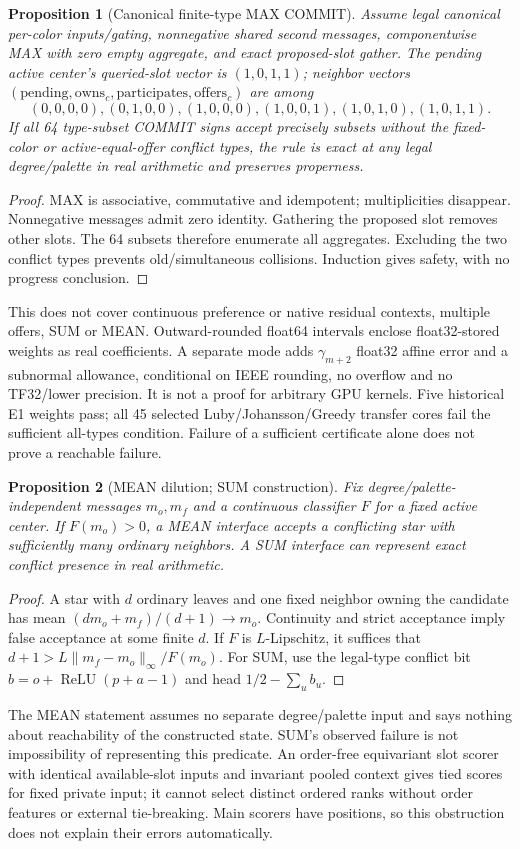 \documentclass[10pt]{article}
\newtheorem{proposition}{Proposition}
\begin{document}
\begin{proposition}[Canonical finite-type MAX COMMIT]\label{prop:max}
Assume legal canonical per-color inputs/gating, nonnegative shared second
messages, componentwise MAX with zero empty aggregate, and exact proposed-slot
gather. The pending active center's queried-slot vector is $(1,0,1,1)$;
neighbor vectors $(\text{pending},\text{owns}_c,\text{participates},\text{offers}_c)$
are among
\[
(0,0,0,0),(0,1,0,0),(1,0,0,0),(1,0,0,1),(1,0,1,0),(1,0,1,1).
\]
If all 64 type-subset COMMIT signs accept precisely subsets without the
fixed-color or active-equal-offer conflict types, the rule is exact at any
legal degree/palette in real arithmetic and preserves properness.
\end{proposition}
\begin{proof}
MAX is associative, commutative and idempotent; multiplicities disappear.
Nonnegative messages admit zero identity. Gathering the proposed slot
removes other slots. The 64 subsets therefore enumerate all aggregates.
Excluding the two conflict types prevents old/simultaneous collisions.
Induction gives safety, with no progress conclusion.
\end{proof}
This does not cover continuous preference or native residual contexts,
multiple offers, SUM or MEAN. Outward-rounded float64 intervals enclose
float32-stored weights as real coefficients. A separate mode adds
$\gamma_{m+2}$ float32 affine error and a subnormal allowance, conditional
on IEEE rounding, no overflow and no TF32/lower precision. It is not a proof
for arbitrary GPU kernels. Five historical E1 weights pass; all 45 selected
Luby/Johansson/Greedy transfer cores fail the sufficient all-types condition.
Failure of a sufficient certificate alone does not prove a reachable failure.

\begin{proposition}[MEAN dilution; SUM construction]
Fix degree/palette-independent messages $m_o,m_f$ and a continuous classifier
$F$ for a fixed active center. If $F(m_o)>0$, a MEAN interface accepts a
conflicting star with sufficiently many ordinary neighbors. A SUM interface
can represent exact conflict presence in real arithmetic.
\end{proposition}
\begin{proof}
A star with $d$ ordinary leaves and one fixed neighbor owning the candidate
has mean $(d m_o+m_f)/(d+1)\to m_o$. Continuity and strict acceptance imply
false acceptance at some finite $d$. If $F$ is $L$-Lipschitz, it suffices
that $d+1>L\|m_f-m_o\|_\infty/F(m_o)$. For SUM, use the legal-type conflict
bit $b=o+\operatorname{ReLU}(p+a-1)$ and head $1/2-\sum_ub_u$.
\end{proof}
The MEAN statement assumes no separate degree/palette input and says
nothing about reachability of the constructed state. SUM's observed failure
is not impossibility of representing this predicate.
An order-free equivariant slot scorer with identical available-slot inputs
and invariant pooled context gives tied scores for fixed private input;
it cannot select distinct ordered ranks without order features or external
tie-breaking. Main scorers have positions, so this obstruction does not
explain their errors automatically.
\end{document}

